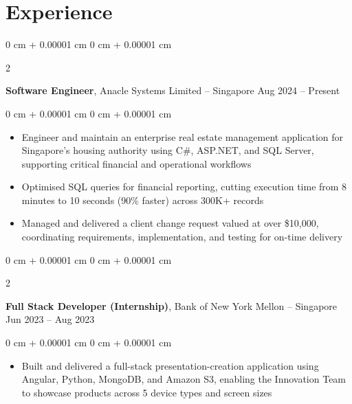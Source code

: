 \documentclass[10pt, letterpaper]{article}
\newenvironment{highlights}{
    \begin{itemize}[
        topsep=0.05 cm,
        parsep=0.05 cm,
        partopsep=0pt,
        itemsep=0pt,
        leftmargin=0 cm + 10pt
    ]
}{
    \end{itemize}
} %
\newenvironment{onecolentry}{
    \begin{adjustwidth}{
        0 cm + 0.00001 cm
    }{
        0 cm + 0.00001 cm
    }
}{
    \end{adjustwidth}
} %
\newenvironment{twocolentry}[2][]{
    \onecolentry
    \def\secondColumn{#2}
    \setcolumnwidth{\fill, 4.5 cm}
    \begin{paracol}{2}
}{
    \switchcolumn \raggedleft \secondColumn
    \end{paracol}
    \endonecolentry
} %
\begin{document}
    
    \section{Experience}



        
        \begin{twocolentry}{
            Aug 2024 -- Present
        }
            \textbf{Software Engineer}, Anacle Systems Limited -- Singapore\end{twocolentry}

        \vspace{0.06 cm}
        \begin{onecolentry}
            \begin{highlights}
                \item Engineer and maintain an enterprise real estate management application for Singapore's housing authority using C\#, ASP.NET, and SQL Server, supporting critical financial and operational workflows
                \item Optimised SQL queries for financial reporting, cutting execution time from 8 minutes to 10 seconds (90\% faster) across 300K+ records
                \item Managed and delivered a client change request valued at over \$10,000, coordinating requirements, implementation, and testing for on-time delivery
            \end{highlights}
        \end{onecolentry}


        \vspace{0.12 cm}

        \begin{twocolentry}{
            Jun 2023 -- Aug 2023
        }
            \textbf{Full Stack Developer (Internship)}, Bank of New York Mellon -- Singapore\end{twocolentry}

        \vspace{0.06 cm}
        \begin{onecolentry}
            \begin{highlights}
                \item Built and delivered a full-stack presentation-creation application using Angular, Python, MongoDB, and Amazon S3, enabling the Innovation Team to showcase products across 5 device types and screen sizes
            \end{highlights}
        \end{onecolentry}
\end{document}
